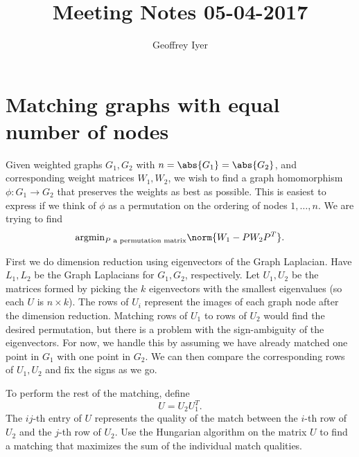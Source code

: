 \documentclass[12pt]{article}
\begin{document}
\title{Meeting Notes 05-04-2017}
\author{Geoffrey Iyer}
\maketitle

\section*{Matching graphs with equal number of nodes}
Given weighted graphs $G_1,G_2$ with $n = \abs{G_1} = \abs{G_2}$, and corresponding weight matrices $W_1,W_2$, we wish to find a graph homomorphism $\phi:G_1\to G_2$ that preserves the weights as best as possible. This is easiest to express if we think of $\phi$ as a permutation on the ordering of nodes $1,\ldots,n$. We are trying to find
\[\text{argmin}_{P\text{ a permutation matrix}}\norm{W_1 - PW_2P^T}.\]

First we do dimension reduction using eigenvectors of the Graph Laplacian. Have $L_1,L_2$ be the Graph Laplacians for $G_1,G_2$, respectively. Let $U_1,U_2$ be the matrices formed by picking the $k$ eigenvectors with the smallest eigenvalues (so each $U$ is $n\times k$). The rows of $U_i$ represent the images of each graph node after the dimension reduction. Matching rows of $U_1$ to rows of $U_2$ would find the desired permutation, but there is a problem with the sign-ambiguity of the eigenvectors. For now, we handle this by assuming we have already matched one point in $G_1$ with one point in $G_2$. We can then compare the corresponding rows of $U_1,U_2$ and fix the signs as we go.

To perform the rest of the matching, define
\[U = U_2U_1^T.\]
The $ij$-th entry of $U$ represents the quality of the match between the $i$-th row of $U_2$ and the $j$-th row of $U_2$. Use the Hungarian algorithm on the matrix $U$ to find a matching that maximizes the sum of the individual match qualities.
\end{document}
